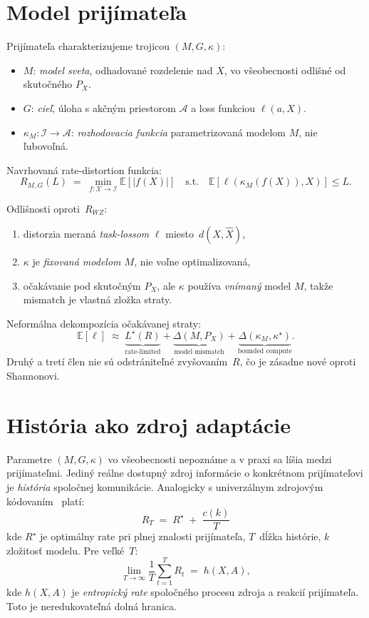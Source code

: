 \documentclass[11pt,a4paper]{article}
\begin{document}
\section{Model prijímateľa}

Prijímateľa charakterizujeme trojicou $(M, G, \kappa)$:
\begin{itemize}
    \item $M$: \emph{model sveta}, odhadované rozdelenie nad $X$,
          vo všeobecnosti odlišné od skutočného $P_X$.
    \item $G$: \emph{cieľ}, úloha s akčným priestorom $\mathcal{A}$
          a loss funkciou $\ell(a, X)$.
    \item $\kappa_M : \mathcal{I} \to \mathcal{A}$:
          \emph{rozhodovacia funkcia} parametrizovaná modelom $M$,
          nie ľubovoľná.
\end{itemize}

\noindent Navrhovaná rate-distortion funkcia:
\begin{equation}
    R_{M,G}(L) \;=\; \min_{f: \mathcal{X} \to \mathcal{I}}
    \mathbb{E}[|f(X)|]
    \quad \text{s.t.} \quad
    \mathbb{E}[\ell(\kappa_M(f(X)), X)] \le L.
    \label{eq:rmg}
\end{equation}

Odlišnosti oproti~$R_{WZ}$:
\begin{enumerate}
    \item distorzia meraná \emph{task-lossom} $\ell$ miesto~$d(X,\hat{X})$,
    \item $\kappa$ je \emph{fixovaná modelom $M$}, nie voľne optimalizovaná,
    \item očakávanie pod skutočným $P_X$, ale $\kappa$ používa
          \emph{vnímaný} model $M$, takže mismatch je vlastná zložka
          straty.
\end{enumerate}

Neformálna dekompozícia očakávanej straty:
\[
    \mathbb{E}[\ell] \;\approx\;
    \underbrace{L^\star(R)}_{\text{rate-limited}}
    + \underbrace{\Delta(M, P_X)}_{\text{model mismatch}}
    + \underbrace{\Delta(\kappa_M, \kappa^\star)}_{\text{bounded compute}}.
\]
Druhý a tretí člen nie sú odstrániteľné zvyšovaním~$R$, čo je zásadne
nové oproti Shannonovi.

\section{História ako zdroj adaptácie}

Parametre $(M, G, \kappa)$ vo všeobecnosti nepoznáme a v praxi sa
líšia medzi prijímateľmi. Jediný reálne dostupný zdroj informácie
o konkrétnom prijímateľovi je \emph{história} spoločnej komunikácie.
Analogicky s univerzálnym zdrojovým kódovaním~\cite{rissanen1978,
lempelziv1977} platí:
\[
    R_T \;=\; R^\star \;+\; \frac{c(k)}{T}
\]
kde $R^\star$ je optimálny rate pri plnej znalosti prijímateľa,
$T$~dĺžka histórie, $k$ zložitosť modelu. Pre veľké~$T$:
\begin{equation}
    \lim_{T \to \infty} \frac{1}{T}\sum_{t=1}^T R_t \;=\; h(X, A),
    \label{eq:entropy-rate}
\end{equation}
kde $h(X, A)$ je \emph{entropický rate} spoločného procesu zdroja
a reakcií prijímateľa. Toto je neredukovateľná dolná hranica.
\end{document}
